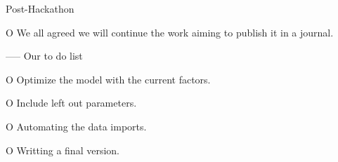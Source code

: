 \documentclass[presentation]{beamer}
\begin{document}
\begin{frame}[label=sec-3]{Post-Hackathon}
\begin{block}{O}
We all agreed we will continue the work aiming to publish it in a journal.
\begin{block}{-----}
\alert{Our to do list}
\end{block}
\begin{block}{O}
Optimize the model with the current factors.
\end{block}
\begin{block}{O}
Include left out parameters.
\end{block}
\begin{block}{O}
Automating the data imports.
\end{block}
\begin{block}{O}
Writting a final version.
\end{block}
\end{block}
\end{frame}
\end{document}
